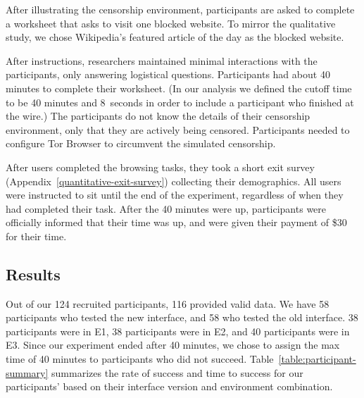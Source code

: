 \documentclass[USenglish,oneside,twocolumn]{article}
\begin{document}
After illustrating the censorship environment, participants are asked to 
complete a worksheet that asks to visit one blocked website. 
To mirror the qualitative study, we chose Wikipedia's featured article of the day 
as the blocked website. 

After instructions, researchers maintained minimal interactions with the participants, 
only answering logistical questions. Participants had
about 40 minutes to complete their worksheet.
(In our analysis we defined the cutoff time to be 40 minutes and 8~seconds
in order to include a participant who finished at the wire.)
The participants do not know the details of their censorship environment,
only that they are actively being censored. Participants needed to configure Tor Browser to 
circumvent the simulated censorship. 

After users completed the browsing tasks, they took a short exit survey (Appendix~\ref{quantitative-exit-survey})
collecting their demographics. All users were instructed to sit until the end of the experiment,
regardless of when they had completed their task. After the 40 minutes were up, 
participants were officially informed that their time was up, and were given their payment of 
\$30 for their time. 

\subsection{Results} 
Out of our 124 recruited participants, 116 provided valid data. We have 58 participants who tested the new interface, and 58 who tested the old interface. 38 participants were in E1, 38 participants were in E2, and 40 participants were in E3. Since our experiment ended after 40 minutes, we chose to assign the max time of 40 minutes to participants who did not succeed. Table~\ref{table:participant-summary} summarizes the rate of success and time to success for our participants' based on their interface version and environment combination. 
\end{document}
